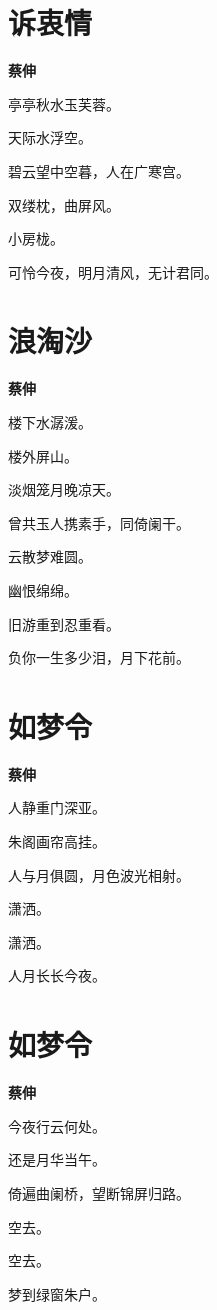 \documentclass[12pt,a4paper]{ctexbook}
\begin{document}
\section{诉衷情}
\textbf{蔡伸}\par\vspace{0.5em}
亭亭秋水玉芙蓉。\par
天际水浮空。\par
碧云望中空暮，人在广寒宫。\par
双缕枕，曲屏风。\par
小房栊。\par
可怜今夜，明月清风，无计君同。\par

\section{浪淘沙}
\textbf{蔡伸}\par\vspace{0.5em}
楼下水潺湲。\par
楼外屏山。\par
淡烟笼月晚凉天。\par
曾共玉人携素手，同倚阑干。\par
云散梦难圆。\par
幽恨绵绵。\par
旧游重到忍重看。\par
负你一生多少泪，月下花前。\par

\section{如梦令}
\textbf{蔡伸}\par\vspace{0.5em}
人静重门深亚。\par
朱阁画帘高挂。\par
人与月俱圆，月色波光相射。\par
潇洒。\par
潇洒。\par
人月长长今夜。\par

\section{如梦令}
\textbf{蔡伸}\par\vspace{0.5em}
今夜行云何处。\par
还是月华当午。\par
倚遍曲阑桥，望断锦屏归路。\par
空去。\par
空去。\par
梦到绿窗朱户。\par
\end{document}
